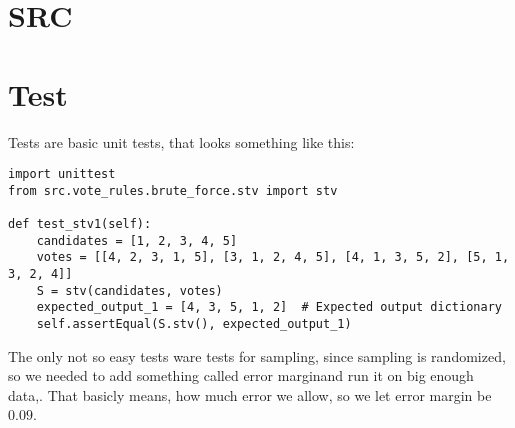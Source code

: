\documentclass[a4paper,12pt]{report}
\begin{document}
	\chapter{SRC}
	
	\chapter{Test}
	
	Tests are basic unit tests, that looks something like this:
	
	\begin{lstlisting}
import unittest
from src.vote_rules.brute_force.stv import stv

def test_stv1(self):
	candidates = [1, 2, 3, 4, 5]
	votes = [[4, 2, 3, 1, 5], [3, 1, 2, 4, 5], [4, 1, 3, 5, 2], [5, 1, 3, 2, 4]]
	S = stv(candidates, votes)
	expected_output_1 = [4, 3, 5, 1, 2]  # Expected output dictionary
	self.assertEqual(S.stv(), expected_output_1)
	\end{lstlisting}
	
	The only not so easy tests ware tests for sampling, since sampling is randomized, so we needed to add something called error marginand run it on big enough data,. That basicly means, how much error we allow, so we let error margin be $0.09$.
	
	
\end{document}
